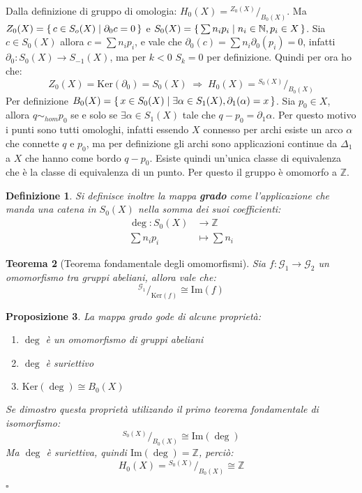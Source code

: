 \documentclass[10pt, twoside=false, x11names]{scrbook}
\newtheorem{theorem}{Teorema}[section]
\newtheorem{proposition}[theorem]{Proposizione}
\newtheorem{definition}[theorem]{Definizione}
\newenvironment{proof}{{\textbf{Dimostrazione}:}}{\hfill $\square$}
\newcommand{\Z}{\mathbb{Z}}
\newcommand{\im}[1]{\mathrm{Im}( #1 )}
\renewcommand{\ker}[1]{\mathrm{Ker}( #1)}
\newcommand*\quot[2]{{^{\textstyle #1}\big/_{\textstyle #2}}}
\begin{document}
\begin{proof}
  Dalla definizione di gruppo di omologia: $ H_0(X) = \quot{Z_0(X)}{B_0(X)} $.
  Ma $ Z_0(X) = \set{ c \in S_o(X) | \partial_0 c = 0} $ e $ S_0(X) = \set{ \sum n_i p_i | n_i \in \mathbb{N}, p_i \in X} $.
  Sia $ c \in S_0(X) $ allora $ c = \sum n_i p_i $, e vale che $ \partial_0(c) = \sum n_i \partial_0 (p_i) = 0 $, infatti
  $ \partial_0 : S_0(X) \to S_{-1}(X) $, ma per $ k < 0 $ $ S_{k} = 0 $ per definizione.
  Quindi per ora ho che:
  \[
    Z_0(X) = \ker{\partial_0} = S_0(X) \; \Rightarrow \; H_0(X) = \quot{S_0(X)}{B_0(X)}
  \]
  Per definizione $ B_0(X) = \set{ x \in S_0(X) | \exists \alpha \in S_1(X), \partial_1(\alpha) = x} $. %
  Sia $ p_0 \in X $, allora $ q \sim_{hom} p_0 $ se e solo se $ \exists \alpha \in S_1(X) $ tale che $ q - p_0 = \partial_1 \alpha $.
  Per questo motivo i punti sono tutti omologhi, infatti
  essendo $ X $ connesso per archi esiste un arco $ \alpha $ che connette $ q $ e $ p_0 $, ma
  per definizione gli archi sono applicazioni continue da $ \Delta_1 $ a $ X $ che hanno come bordo $ q - p_0 $.
  Esiste quindi un'unica classe di equivalenza che è la classe di equivalenza di un punto.
  Per questo il gruppo è omomorfo a $ \Z $.

  \begin{definition}
    Si definisce inoltre la mappa \textbf{grado}  come l'applicazione che manda una catena in $ S_0(X) $ nella somma
    dei suoi coefficienti:
    \begin{align*}
      \deg \colon S_0(X)    & \to  \Z \\
                     \sum n_i p_i & \mapsto  \sum n_i
    \end{align*}
  \end{definition}

  \begin{theorem}[Teorema fondamentale degli omomorfismi]
    Sia $ f: \mathcal{G}_1 \to \mathcal{G}_2 $ un omomorfismo tra gruppi abeliani, allora vale che:
    \[
      \quot{\mathcal{G}_1}{\ker{f}} \cong \im{f}
    \]
  \end{theorem}

  \begin{proposition}
    La mappa grado gode di alcune proprietà:
    \begin{enumerate}
    \item $ \deg $ è un omomorfismo di gruppi abeliani
    \item $ \deg $ è suriettivo
    \item $ \ker{\deg} \cong B_0(X) $
    \end{enumerate}
    Se dimostro questa proprietà utilizando il primo teorema fondamentale di isomorfismo:
    \[
      \quot{S_0(X)}{B_0(X)} \cong \im{\deg}
    \]
    Ma $ \deg $ è suriettiva, quindi $ \im{\deg} = \Z $, perciò:
    \[
      H_0(X) = \quot{S_0(X)}{B_0(X)} \cong \Z
    \]


\end{proposition}
\end{proof}
\end{document}
